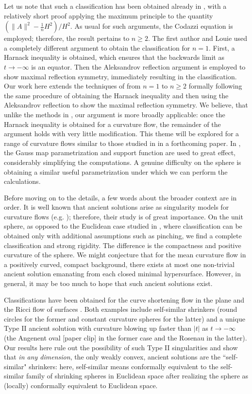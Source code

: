 \documentclass{amsart}
\theoremstyle{definition}
\theoremstyle{remark}
\numberwithin{equation}{section}
\begin{document}
Let us note that such a classification has been obtained already in \cite[Theorem 6.1]{Hu-Sin 2014}, with a relatively short proof applying the maximum principle to the quantity $(\|A\|^2 - \tfrac{1}{n}H^2)/H^2$. As usual for such arguments, the Codazzi equation is employed; therefore, the result pertains to $n\geq 2$. The first author and Louie \cite{Br-Lou} used a completely different argument to obtain the classification for $n=1$. First, a Harnack inequality is obtained, which ensures that the backwards limit as $t \to -\infty$ is an equator. Then the Aleksandrov reflection argument is employed to show maximal reflection symmetry, immediately resulting in the classification. Our work here extends the techniques of \cite{Br-Lou} from $n=1$ to $n\geq 2$ formally following the same procedure of obtaining the Harnack inequality and then using the Aleksandrov reflection to show the maximal reflection symmetry. We believe, that unlike the methods in \cite{Hu-Sin 2014}, our argument is more broadly applicable: once the Harnack inequality is obtained for a curvature flow, the remainder of the argument holds with very little modification. This theme will be explored for a range of curvature flows similar to those studied in \cite{Andrews 94} in a forthcoming paper. In \cite{Andrews 94}, the Gauss map parametrization and support function are used to great effect, considerably simplifying the computations. A genuine difficulty on the sphere is obtaining a similar useful parametrization under which we can perform the calculations.

Before moving on to the details, a few words about the broader context are in order. It is well known that ancient solutions arise as singularity models for curvature flows (e.g. \cite{Hu-Sin 1999}); therefore, their study is of great importance. On the unit sphere, as opposed to the Euclidean case studied in \cite{Hu-Sin 2014}, where classification can be obtained only with additional assumptions such as pinching, we find a complete classification and strong rigidity. The difference is the compactness and positive curvature of the sphere. We might conjecture that for the mean curvature flow in a positively curved, compact background, there exists at most one non-trivial ancient solution emanating from each closed minimal hypersurface. However, in general, it may be too much to hope that such ancient solutions exist.

Classifications have been obtained for the curve shortening flow in the plane \cite{Da-Ham-Sesu 2010} and the Ricci flow of surfaces \cite{Da-Ham-Sesu 2012}. Both examples include self-similar shrinkers (round circles for the former and constant curvature spheres for the latter) and a unique Type II ancient solution with curvature blowing up faster than $|t|$ as $t\to-\infty$ (the Angenent oval [paper clip] in the former case and the Rosenau in the latter). Our results here rule out the possibility of such Type II singularities and show that \emph{in any dimension}, the only weakly convex, ancient solutions are the ``self-similar" shrinkers: here, self-similar means conformally equivalent to the self-similar family of shrinking spheres in Euclidean space after realizing the sphere as (locally) conformally equivalent to Euclidean space.
\end{document}
